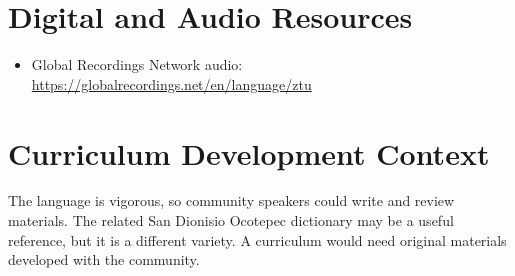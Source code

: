 \documentclass[12pt]{article}
\begin{document}
\section{Digital and Audio Resources}
\begin{itemize}
\item Global Recordings Network audio: \url{https://globalrecordings.net/en/language/ztu}
\end{itemize}

\section{Curriculum Development Context}
The language is vigorous, so community speakers could write and review materials. The related San Dionisio Ocotepec dictionary may be a useful reference, but it is a different variety. A curriculum would need original materials developed with the community.
\end{document}
